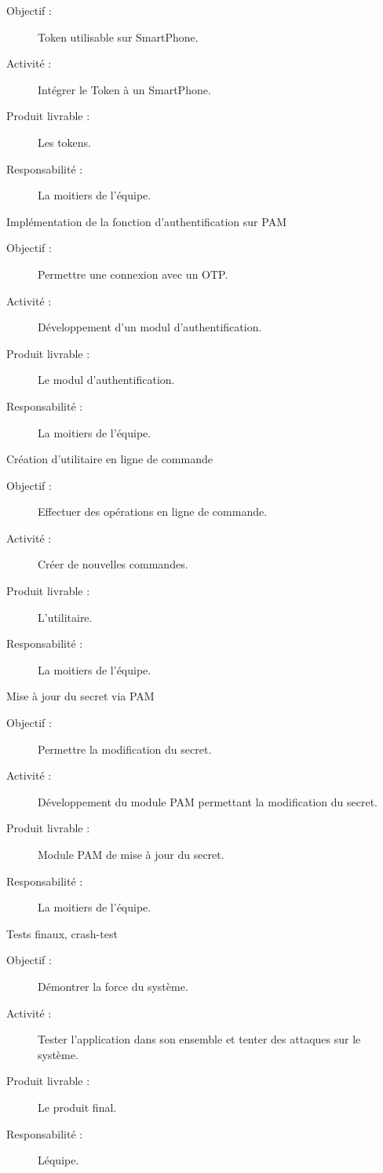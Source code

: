 \documentclass{../../res/univ-projet}
\begin{document}
\begin{description}
		    \begin{description}
		        \item [Objectif :] Token utilisable sur SmartPhone.
		        \item [Activité :] Intégrer le Token à un SmartPhone.
		        \item [Produit livrable :] Les tokens.
		        \item [Responsabilité :]  La moitiers de l'équipe.
		    \end{description}
	    \item [Étape 9 :] Implémentation de la fonction d'authentification sur PAM
		    \begin{description}
		        \item [Objectif :] Permettre une connexion avec un OTP.
		        \item [Activité :] Développement d'un modul d'authentification.
		        \item [Produit livrable :] Le modul d'authentification.
		        \item [Responsabilité :]  La moitiers de l'équipe.
		    \end{description}
	    \item [Étape 10 :] Création d'utilitaire en ligne de commande
		    \begin{description}
		        \item [Objectif :] Effectuer des opérations en ligne de commande.
		        \item [Activité :] Créer de nouvelles commandes.
		        \item [Produit livrable :] L'utilitaire.
		        \item [Responsabilité :]  La moitiers de l'équipe.
		    \end{description}
	    \item [Étape 11 :] Mise à jour du secret via PAM
		    \begin{description}
		        \item [Objectif :] Permettre la modification du secret.
		        \item [Activité :] Développement du module PAM permettant la modification du secret.
		        \item [Produit livrable :] Module PAM de mise à jour du secret.
		        \item [Responsabilité :]  La moitiers de l'équipe.
		    \end{description}
	    \item [Étape 12 :] Tests finaux, crash-test
		    \begin{description}
		        \item [Objectif :] Démontrer la force du système.
		        \item [Activité :] Tester l'application dans son ensemble et tenter des attaques sur le système.
		        \item [Produit livrable :] Le produit final.
		        \item [Responsabilité :]  Léquipe.
		    \end{description}
    \end{description}
\end{document}
